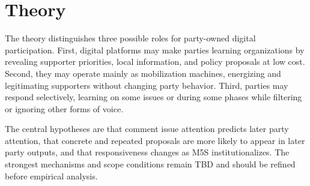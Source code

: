 \section{Theory}\label{sec:theory}

The theory distinguishes three possible roles for party-owned digital participation. First, digital platforms may make parties learning organizations by revealing supporter priorities, local information, and policy proposals at low cost. Second, they may operate mainly as mobilization machines, energizing and legitimating supporters without changing party behavior. Third, parties may respond selectively, learning on some issues or during some phases while filtering or ignoring other forms of voice.

The central hypotheses are that comment issue attention predicts later party attention, that concrete and repeated proposals are more likely to appear in later party outputs, and that responsiveness changes as M5S institutionalizes. The strongest mechanisms and scope conditions remain TBD and should be refined before empirical analysis.
